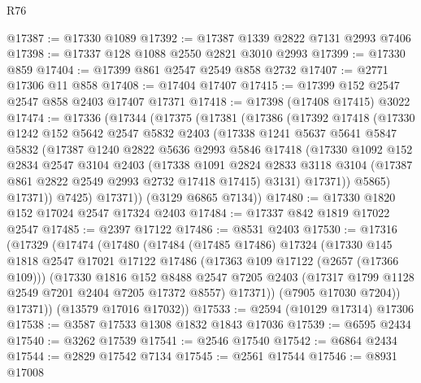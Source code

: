 \begin{lexlean}{R76}
\begin{coremodule}
@17387 := @17330 @1089
@17392 := @17387 @1339 @2822 @7131 @2993 @7406
@17398 := @17337 @128 @1088 @2550 @2821 @3010 @2993
@17399 := @17330 @859
@17404 := @17399 @861 @2547 @2549 @858 @2732
@17407 := @2771 @17306 @11 @858
@17408 := @17404 @17407
@17415 := @17399 @152 @2547 @2547 @858 @2403 @17407 @17371
@17418 := @17398 (@17408 @17415) @3022
@17474 := @17336
    (@17344
      (@17375
        (@17381
          (@17386
            (@17392
              @17418
              (@17330
                @1242
                @152
                @5642
                @2547
                @5832
                @2403
                (@17338
                  @1241
                  @5637
                  @5641
                  @5847
                  @5832
                  (@17387
                    @1240
                    @2822
                    @5636
                    @2993
                    @5846
                    @17418
                    (@17330
                      @1092
                      @152
                      @2834
                      @2547
                      @3104
                      @2403
                      (@17338
                        @1091
                        @2824
                        @2833
                        @3118
                        @3104
                        (@17387 @861 @2822 @2549 @2993 @2732 @17418 @17415)
                        @3131)
                      @17371))
                  @5865)
                @17371))
            @7425)
          @17371))
      (@3129 @6865 @7134))
@17480 := @17330 @1820 @152 @17024 @2547 @17324 @2403
@17484 := @17337 @842 @1819 @17022 @2547
@17485 := @2397 @17122
@17486 := @8531 @2403
@17530 := @17316
    (@17329
      (@17474
        (@17480
          (@17484
            (@17485 @17486)
            @17324
            (@17330
              @145
              @1818
              @2547
              @17021
              @17122
              @17486
              (@17363 @109 @17122 (@2657 (@17366 @109)))
              (@17330
                @1816
                @152
                @8488
                @2547
                @7205
                @2403
                (@17317 @1799 @1128 @2549 @7201 @2404 @7205 @17372 @8557)
                @17371))
            (@7905 @17030 @7204))
          @17371))
      (@13579 @17016 @17032))
@17533 := @2594 (@10129 @17314) @17306
@17538 := @3587 @17533 @1308 @1832 @1843 @17036
@17539 := @6595 @2434
@17540 := @3262 @17539
@17541 := @2546 @17540
@17542 := @6864 @2434
@17544 := @2829 @17542 @7134
@17545 := @2561 @17544
@17546 := @8931 @17008

\end{coremodule}
\end{lexlean}
